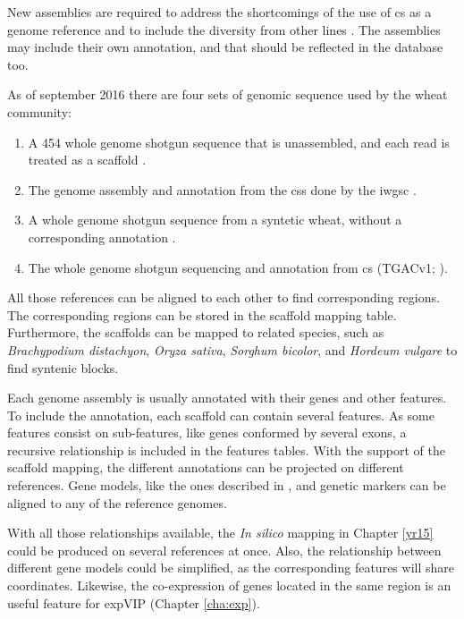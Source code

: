 New assemblies are required to address the shortcomings of the use of \acrshort{cs} as a genome reference and to include the diversity from other lines \citep{Allen2016,Winfield2016}. 
The assemblies may include their own annotation, and that should be reflected in the database too. 

As of september 2016 there are four sets of genomic sequence used by the wheat community:
\begin{enumerate}
	\item  A 454 whole genome shotgun sequence that is unassembled, and each read is treated as a scaffold \citep{Brenchley2012}.
	\item The genome assembly and annotation from the \gls{css} done by the \acrshort{iwgsc} \citep{Mayer2014}.
	\item A whole genome shotgun sequence from a syntetic wheat, without a corresponding annotation \citep{Chapman2015}.
	\item The whole genome shotgun sequencing and annotation from \acrshort{cs} (TGACv1; \citealt{Clark2016}).
\end{enumerate}

All those references can be aligned to each other to find corresponding regions. 
The corresponding regions can be stored in the scaffold mapping table. 
Furthermore, the scaffolds can be mapped to related species, such as \textit{Brachypodium distachyon}, \textit{Oryza sativa}, \textit{Sorghum bicolor}, and \textit{Hordeum vulgare} to find syntenic blocks. 

Each genome assembly is usually annotated with their genes and other features. 
To include the annotation, each scaffold can contain several features. 
As some features consist on sub-features, like genes conformed by several exons, a recursive relationship is included in the features tables. 
With the support of the scaffold mapping, the different annotations can be projected on different references. 
Gene models, like the ones described in \citep{Krasileva2013}, and  genetic markers can be aligned to any of the reference genomes.

With all those relationships available, the \textit{In silico} mapping in Chapter \ref{yr15} could be produced on several references at once. 
Also, the relationship between different gene models could be simplified, as the corresponding features will share coordinates.
Likewise, the co-expression of genes located in the same region is an useful feature for expVIP (Chapter \ref{cha:exp}). 

